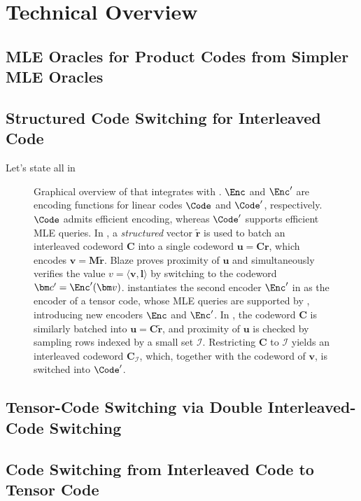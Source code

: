 \section{Technical Overview}
\label{sec:overview}

\subsection{MLE Oracles for Product Codes from Simpler MLE Oracles}


\subsection{Structured Code Switching for Interleaved Code}
Let's state all in 

\clearpage
\begin{figure}[!t]
\centering
\resizebox{0.75\linewidth}{!}{

}
\caption{
Graphical overview of \methodname that integrates \blazeplus with \tensorswitchplus.
$\Enc$ and $\Enc'$ are encoding functions for linear codes $\Code$ and $\Code'$, respectively.
$\Code$ admits efficient encoding, whereas $\Code'$ supports efficient MLE queries.
In \blazeplus, a \emph{structured} vector $\tilde{\bm{r}}$ is used to batch an interleaved codeword $\bm{C}$ into a single codeword $\bm{u}=\bm{C}\bm{r}$, which encodes $\bm v=\bm M\tilde{\bm{r}}$.
Blaze proves proximity of $\bm u$ and simultaneously verifies the value
$v=\langle\bm v,\bm l\rangle$ by switching to the codeword $\bm c'=\Enc'(\bm v)$.
\methodname instantiates the second encoder $\Enc'$ in \blazeplus as the encoder of a tensor code,
whose MLE queries are supported by \tensorswitchplus,
introducing new encoders $\Enc$ and $\Enc'$.
In \tensorswitchplus, the codeword $\bm C$ is similarly batched into
$\bm u=\bm C\tilde{\bm{r}}$, and proximity of $\bm u$ is checked by sampling rows indexed by a small set $\mathcal I$.
Restricting $\bm C$ to $\mathcal I$ yields an interleaved codeword $\bm C_{\mathcal I}$, which, together with the codeword of $\bm v$, is switched into $\Code'$.
}
\label{fig:enc}
\vspace{-10pt}
\end{figure}

\subsection{Tensor-Code Switching via Double Interleaved-Code Switching}

\subsection{Code Switching from Interleaved Code to Tensor Code}

